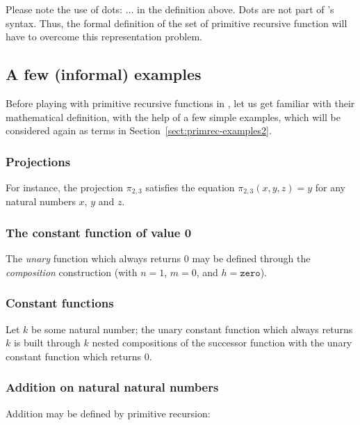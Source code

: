 Please note the use of dots: $\ldots$ in the definition above. 
Dots are not part of \gallina's syntax. Thus, the formal definition of the set of primitive recursive function will have to overcome this representation problem.


\subsection{A few (informal) examples}
\label{sect:PR-informal}
\label{sect:primrec-examples1}
Before playing with primitive recursive functions in \coq{}, let us get familiar with their mathematical definition, with the help of a few simple examples, which will be considered again
as \coq terms in Section~\vref{sect:primrec-examples2}.

\subsubsection{Projections}

For instance, the projection $\pi_{2,3}$ satisfies the equation
$\pi_{2,3}(x,y,z)=y$ for any natural numbers $x$, $y$ and $z$.

\subsubsection{The constant function of value 0}
\label{sect:k0}

The \emph{unary} function which always returns $0$ may be defined through the \emph{composition} construction (with $n=1$, $m=0$, and $h=\texttt{zero}$).



\subsubsection{Constant functions}

Let $k$ be some natural number; the unary constant function which always returns $k$ is built through $k$ nested compositions of the 
successor function with the  unary constant function which returns $0$.


\subsubsection{Addition on natural natural numbers}

Addition may be defined by primitive recursion:

